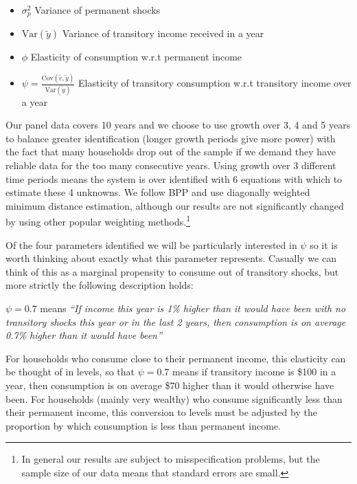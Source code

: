 \documentclass[titlepage]{\econtex}\newcommand{\texname}{IncomeUncertainty}
\begin{document}
	\begin{itemize}
	\item $\sigma^2_p$ Variance of permanent shocks
	\item $\mathrm{Var}(\tilde{y})$ Variance of transitory income received in a year
	\item $\phi$ Elasticity of consumption w.r.t permanent income
	\item $\psi = \frac{\mathrm{Cov}(\tilde{c},\tilde{y})}{\mathrm{Var}(\tilde{y})}$ Elasticity of transitory consumption w.r.t transitory income over a year
\end{itemize}
Our panel data covers 10 years and we choose to use growth over 3, 4 and 5 years to balance greater identification (longer growth periods give more power) with the fact that many households drop out of the sample if we demand they have reliable data for the too many consecutive years. Using growth over 3 different time periods means the system is over identified with 6 equations with which to estimate these 4 unknowns. We follow BPP and use diagonally weighted minimum distance estimation, although our results are not significantly changed by using other popular weighting methods.\footnote{In general our results are subject to misspecification problems, but the sample size of our data means that standard errors are small.}

Of the four parameters identified we will be particularly interested in $\psi$ so it is worth thinking about exactly what this parameter represents. Casually we can think of this as a marginal propensity to consume out of transitory shocks, but more strictly the following description holds:

$\psi=0.7$ means \textit{``If income this year is 1\% higher than it would have been with no transitory shocks this year or in the last 2 years, then consumption is on average 0.7\% higher than it would have been''}

For households who consume close to their permanent income, this elasticity can be thought of in levels, so that $\psi=0.7$ means if transitory income is \$100 in a year, then consumption is on average \$70 higher than it would otherwise have been. For households (mainly very wealthy) who consume significantly less than their permanent income, this conversion to levels must be adjusted by the proportion by which consumption is less than permanent income.
\end{document}

